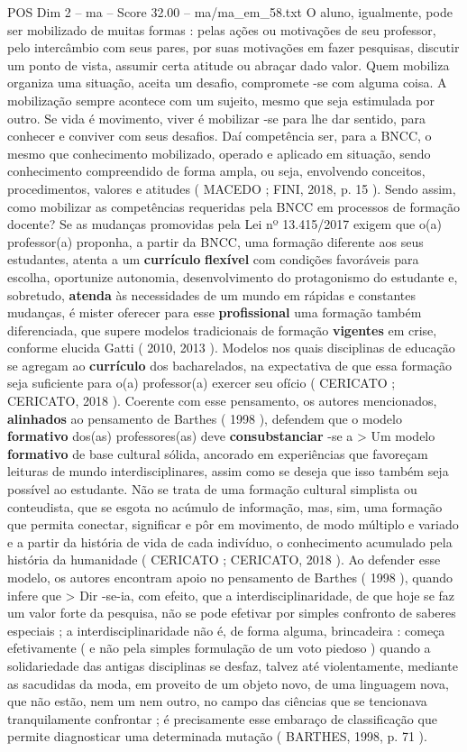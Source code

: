 \begin{textsample}{POS Dim 2 – ma – Score 32.00 – ma/ma\_em\_58.txt}
O aluno, igualmente, pode ser mobilizado de muitas formas : pelas ações ou motivações de seu professor, pelo intercâmbio com seus pares, por suas motivações em fazer pesquisas, discutir um ponto de vista, assumir certa atitude ou abraçar dado valor.
Quem mobiliza organiza uma situação, aceita um desafio, compromete -se com alguma coisa.
A mobilização sempre acontece com um sujeito, mesmo que seja estimulada por outro.
Se vida é movimento, viver é mobilizar -se para lhe dar sentido, para conhecer e conviver com seus desafios.
Daí competência ser, para a BNCC, o mesmo que conhecimento mobilizado, operado e aplicado em situação, sendo conhecimento compreendido de forma ampla, ou seja, envolvendo conceitos, procedimentos, valores e atitudes ( MACEDO ; FINI, 2018, p. 15 ).
Sendo assim, como mobilizar as competências requeridas pela BNCC em processos de formação docente?
Se as mudanças promovidas pela Lei nº 13.415/2017 exigem que o(a) professor(a) proponha, a partir da BNCC, uma formação diferente aos seus estudantes, atenta a um \textbf{currículo} \textbf{flexível} com condições favoráveis para escolha, oportunize autonomia, desenvolvimento do protagonismo do estudante e, sobretudo, \textbf{atenda} às necessidades de um mundo em rápidas e constantes mudanças, é mister oferecer para esse \textbf{profissional} uma formação também diferenciada, que supere modelos tradicionais de formação \textbf{vigentes} em crise, conforme elucida Gatti ( 2010, 2013 ).
Modelos nos quais disciplinas de educação se agregam ao \textbf{currículo} dos bacharelados, na expectativa de que essa formação seja suficiente para o(a) professor(a) exercer seu ofício ( CERICATO ; CERICATO, 2018 ).
Coerente com esse pensamento, os autores mencionados, \textbf{alinhados} ao pensamento de Barthes ( 1998 ), defendem que o modelo \textbf{formativo} dos(as) professores(as) deve \textbf{consubstanciar} -se a > Um modelo \textbf{formativo} de base cultural sólida, ancorado em experiências que favoreçam leituras de mundo interdisciplinares, assim como se deseja que isso também seja possível ao estudante.
Não se trata de uma formação cultural simplista ou conteudista, que se esgota no acúmulo de informação, mas, sim, uma formação que permita conectar, significar e pôr em movimento, de modo múltiplo e variado e a partir da história de vida de cada indivíduo, o conhecimento acumulado pela história da humanidade ( CERICATO ; CERICATO, 2018 ).
Ao defender esse modelo, os autores encontram apoio no pensamento de Barthes ( 1998 ), quando infere que > Dir -se-ia, com efeito, que a interdisciplinaridade, de que hoje se faz um valor forte da pesquisa, não se pode efetivar por simples confronto de saberes especiais ; a interdisciplinaridade não é, de forma alguma, brincadeira : começa efetivamente ( e não pela simples formulação de um voto piedoso ) quando a solidariedade das antigas disciplinas se desfaz, talvez até violentamente, mediante as sacudidas da moda, em proveito de um objeto novo, de uma linguagem nova, que não estão, nem um nem outro, no campo das ciências que se tencionava tranquilamente confrontar ; é precisamente esse embaraço de classificação que permite diagnosticar uma determinada mutação ( BARTHES, 1998, p. 71 ).

\end{textsample}
